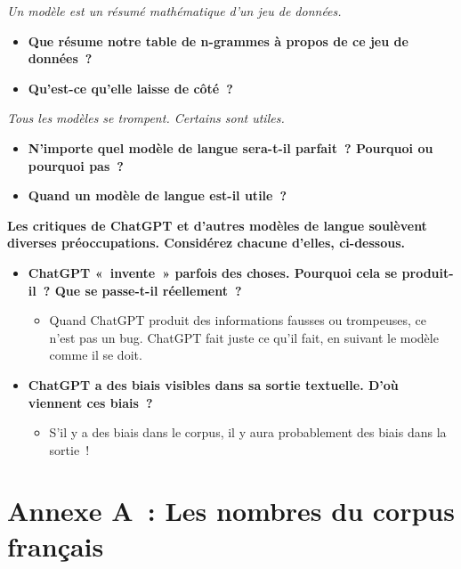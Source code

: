 \documentclass[12pt,a4paper]{article}
\begin{document}
\begin{thinkbox}
  \emph{Un modèle est un résumé mathématique d'un jeu de données.}
  \begin{itemize}
    \item \textbf{Que résume notre table de n-grammes à propos de ce jeu de données~?}
    \item \textbf{Qu'est-ce qu'elle laisse de côté~?}
  \end{itemize}

  \emph{Tous les modèles se trompent. Certains sont utiles.}
  \begin{itemize}
    \item \textbf{N'importe quel modèle de langue sera-t-il \textbf{parfait}~? Pourquoi ou pourquoi pas~?}
    \item \textbf{Quand un modèle de langue est-il \textbf{utile}~?}
  \end{itemize}
\end{thinkbox}

\begin{keypointbox}
  \textbf{Les critiques de ChatGPT et d'autres modèles de langue soulèvent diverses préoccupations. Considérez chacune d'elles, ci-dessous.}

  \begin{itemize}
    \item \textbf{ChatGPT «~invente~» parfois des choses. Pourquoi cela se produit-il~? Que se passe-t-il réellement~?}
    \begin{itemize}
      \item Quand ChatGPT produit des informations fausses ou trompeuses, ce n'est pas un bug. ChatGPT fait juste ce qu'il fait, en suivant le modèle comme il se doit.
    \end{itemize}
    \item \textbf{ChatGPT a des biais visibles dans sa sortie textuelle. D'où viennent ces biais~?}
    \begin{itemize}
      \item S'il y a des biais dans le corpus, il y aura probablement des biais dans la sortie~!
    \end{itemize}
  \end{itemize}
\end{keypointbox}

\newpage

\section*{Annexe A~: Les nombres du corpus français}
\end{document}
